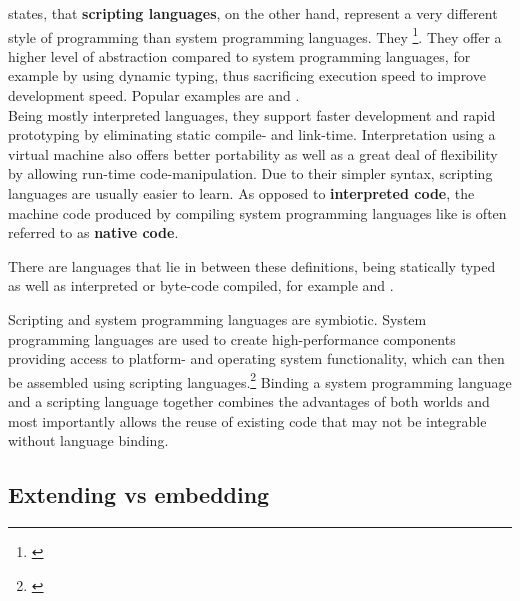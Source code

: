  states, that \textbf{scripting languages}, on the other hand, represent a very different style of programming than system programming languages. They \footnote{\citep{Ousterhout}}. They offer a higher level of abstraction compared to system programming languages, for example by using dynamic typing, thus sacrificing execution speed to improve development speed. Popular examples are  and .
\\ Being mostly interpreted languages, they support faster development and rapid prototyping by eliminating static compile- and link-time. Interpretation using a virtual machine also offers better portability as well as a great deal of flexibility by allowing run-time code-manipulation. Due to their simpler syntax, scripting languages are usually easier to learn. 
As opposed to \textbf{interpreted code}, the machine code produced by compiling system programming languages like  is often referred to as \textbf{native code}.

There are languages that lie in between these definitions, being statically typed as well as interpreted or byte-code compiled, for example  and . 

Scripting and system programming languages are symbiotic. System programming languages are used to create high-performance components providing access to platform- and operating system functionality, which can then be assembled using scripting languages.\footnote{\citep{Ousterhout}} Binding a system programming language and a scripting language together combines the advantages of both worlds and most importantly allows the reuse of existing code that may not be integrable without language binding.

\subsection{Extending vs embedding}

